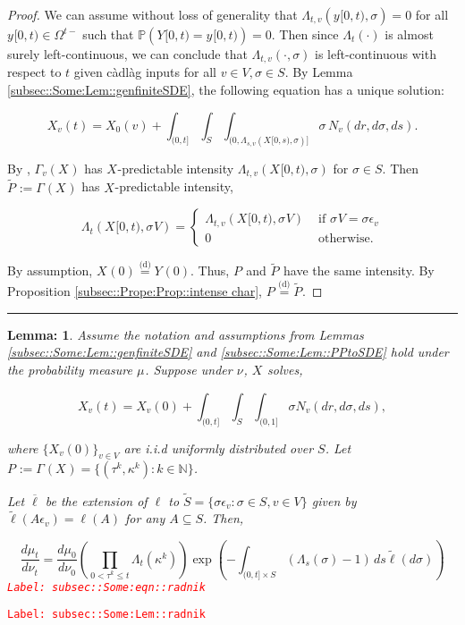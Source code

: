 \documentclass[12pt]{article}
\newcommand{\mb}{\mathbb}
\newcommand{\ov}{\overline}
\newcommand{\te}{\text}
\newcommand{\ep}{\epsilon}
\newcommand{\tr}{\textcolor{red}}
\newcommand{\labe}[1]{\tr{\texttt{Label: #1}}}
\newcommand{\ind}{\hspace{24pt}}
\newcommand{\lin}{\rule{\linewidth}{0.4 pt}}
\newcommand{\pr}{\mb{P}}							%
\newcommand{\deq}{\overset{\text{(d)}}{=}}			%
\newcommand{\defeq}{:=}								%
\renewcommand{\v}{v}							%
\renewcommand{\S}{S}							%
\newcommand{\s}{\sigma}							%
\newcommand{\sv}[1]{\s^{#1}}					%
\newcommand{\ev}[1]{\ep_{#1}}					%
\newcommand{\OmegaV}[2]{\Omega_{#1}^{#2}}		%
\renewcommand{\t}{t}							%
\newcommand{\poiss}[1]{N_{#1}}						%
\newcommand{\V}{V}									%
\renewcommand{\tt}{s}								%
\renewcommand{\r}{r}								%
\newcommand{\rt}[1]{\tau^{#1}}						%
\renewcommand{\it}{k}								%
\newcommand{\XState}[1]{\S^{#1}}				%
\newcommand{\rxvt}[2]{X_{#1}{(#2)}}					%
\newcommand{\rxvtt}[2]{Y_{#1}{(#2)}}				%
\newcommand{\xvtts}[2]{y_{#1}{#2}}					%
\newcommand{\rxvts}[2]{X_{#1}{#2}}					%
\newcommand{\rxvtts}[2]{Y_{#1}{#2}}					%
\newcommand{\rp}[1]{P^{#1}}							%
\newcommand{\m}[3]{\mu_{#2#1}^{#3}}						%
\newcommand{\mm}[3]{\nu_{#2#1}^{#3}}						%
\newcommand{\ratee}[1]{\Lambda_{#1}}				%
\newcommand{\Sm}{\ell}								%
\newcommand{\alt}{\widetilde}						%
\newcommand{\typset}{A}							%
\renewcommand{\mark}[1]{\kappa^{#1}}				%
\newcommand{\pmap}[1]{\Gamma_{#1}}				%
\newtheorem{lem}[thms]{Lemma: }
\begin{document}
\begin{proof}

We can assume without loss of generality that \(\ratee{\t,\v}(\xvtts{}{[0,\t)},\s) = 0\) for all \(\xvtts{}{[0,\t)}\in \OmegaV{}{\t-}\) such that \(\pr(\rxvtts{}{[0,\t)} = \xvtts{}{[0,\t)}) = 0\). Then since \(\ratee{\t}(\cdot)\) is almost surely left-continuous, we can conclude that \(\ratee{\t,\v}(\cdot,\s)\) is left-continuous with respect to \(\t\) given c\`adl\`ag inputs for all \(\v\in \V,\s\in\S\). By Lemma \ref{subsec::Some:Lem::genfiniteSDE}, the following equation has a unique solution:

\[\rxvt{\v}{\t} = \rxvt{0}{\v} + \int_{(0,\t]}\int_\S\int_{(0,\ratee{\tt,\v}(\rxvts{}{[0,\tt)},\s)]}  \s\,\poiss{\v}(d\r,d\s,d\tt).\]

By \cite[Exercise 14.7.1]{DalVer08}, \(\pmap{\v}(\rxvts{}{})\) has \(\rxvts{}{}\)-predictable intensity \(\ratee{\t,\v}(\rxvts{}{[0,\t)},\s)\) for \(\s \in \S\). Then \(\alt{\rp{}} \defeq \pmap{}(\rxvts{}{})\) has \(\rxvts{}{}\)-predictable intensity,

\[\ratee{\t}(\rxvts{}{[0,\t)},\sv{}{\V}) = \begin{cases}
\ratee{\t,\v}(\rxvts{}{[0,\t)},\sv{}{\V}) &\te{ if } \sv{}{\V} = \s\ev{\v}\\
0&\te{ otherwise.}
\end{cases}\]

By assumption, \(\rxvt{}{0} \deq \rxvtt{}{0}\). Thus, \(\rp{}\) and \(\alt{\rp{}}\) have the same intensity. By Proposition \ref{subsec::Prope:Prop::intense char}, \(\rp{} \deq \alt{\rp{}}\).
\end{proof}
\lin

\begin{lem}
Assume the notation and assumptions from Lemmas \ref{subsec::Some:Lem::genfiniteSDE} and \ref{subsec::Some:Lem::PPtoSDE} hold under the probability measure \(\m{}{}{}\). Suppose under \(\mm{}{}{}\), \(\rxvts{}{}\) solves,

\[\rxvt{\v}{\t} = \rxvt{\v}{0} +\int_{(0,\t]}\int_\S\int_{(0,1]} \s \poiss{\v}(d\r,d\s,d\tt),\]

where \(\{\rxvt{\v}{0}\}_{\v \in \V}\) are i.i.d uniformly distributed over \(\S\). Let \(\rp{} \defeq \pmap{}(\rxvts{}{}) = \{(\rt{\it},\mark{\it}):\it\in \mb{N}\}\).

\ind Let \(\ov{\ell}\) be the extension of \(\Sm\) to \(\alt{\S} = \{\s\ev{\v}: \s \in \S, \v \in \V\}\) given by \(\alt{\Sm}(\typset\ev{\v}) = \Sm(\typset)\) for any \(\typset \subseteq \S\). Then,

\begin{equation}
\frac{d\m{}{\t}{}}{d\mm{}{\t}{}}= \frac{d\m{}{0}{}}{d\mm{}{0}{}}\left(\prod_{0< \rt{\it}\leq t} \ratee{\t}(\mark{\it})\right)\exp\left(-\int_{(0,\t]\times \S} (\ratee{\tt}(\s) - 1)\,d\tt\alt{\Sm}(d\s)\right)
\label{subsec::Some:eqn::radnik}
\end{equation}
\labe{subsec::Some:eqn::radnik}
\label{subsec::Some:Lem::radnik}
\end{lem}
\labe{subsec::Some:Lem::radnik}
\end{document}
